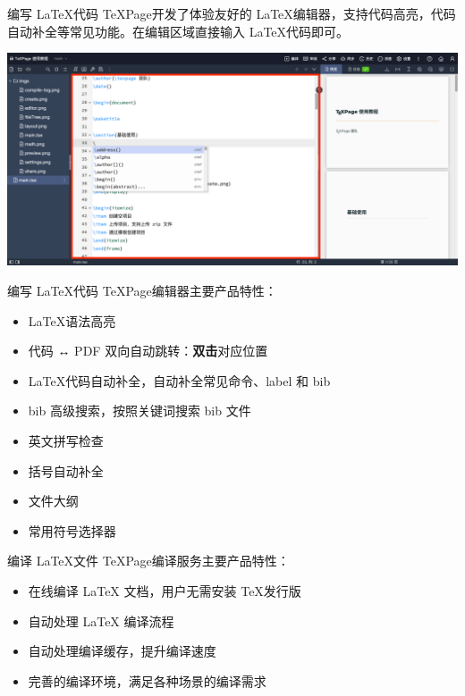 \documentclass{beamer}
\DeclareRobustCommand\texpage{\TeX Page}
\newenvironment{display}{\trivlist\item[]}{\endtrivlist}
\begin{document}
\begin{frame}{编写 \LaTeX 代码}
\texpage 开发了体验友好的 \LaTeX 编辑器，支持代码高亮，代码自动补全等常见功能。在编辑区域直接输入 \LaTeX 代码即可。

\begin{display}
\includegraphics[width=\textwidth]{imgs/editor.png}
\end{display}
\end{frame}


\begin{frame}{编写 \LaTeX 代码}
\texpage 编辑器主要产品特性：

\begin{itemize}
\item \LaTeX 语法高亮
\item 代码 ↔ PDF 双向自动跳转：\textbf{双击}对应位置
\item \LaTeX 代码自动补全，自动补全常见命令、label 和 bib
\item bib 高级搜索，按照关键词搜索 bib 文件
\item 英文拼写检查
\item 括号自动补全
\item 文件大纲
\item 常用符号选择器
\end{itemize}
\end{frame}


\begin{frame}{编译 \LaTeX 文件}
\texpage 编译服务主要产品特性：
\begin{itemize}
    \item 在线编译 LaTeX 文档，用户无需安装 \TeX 发行版
    \item 自动处理 LaTeX 编译流程
    \item 自动处理编译缓存，提升编译速度
    \item 完善的编译环境，满足各种场景的编译需求
\end{itemize}

\end{frame}
\end{document}
